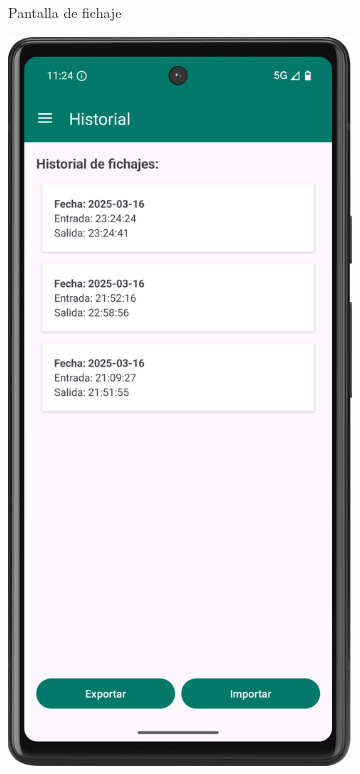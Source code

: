 \begin{figure}[H]
\begin{subfigure}[b]{0.3\textwidth}
         \caption{Pantalla de fichaje}
         \label{fig:fichando}
     \end{subfigure}
     \hfill
     \begin{subfigure}[b]{0.3\textwidth}
         \centering
         \includegraphics[width=\textwidth]{root/historial.png}

\end{subfigure}
\end{figure}
